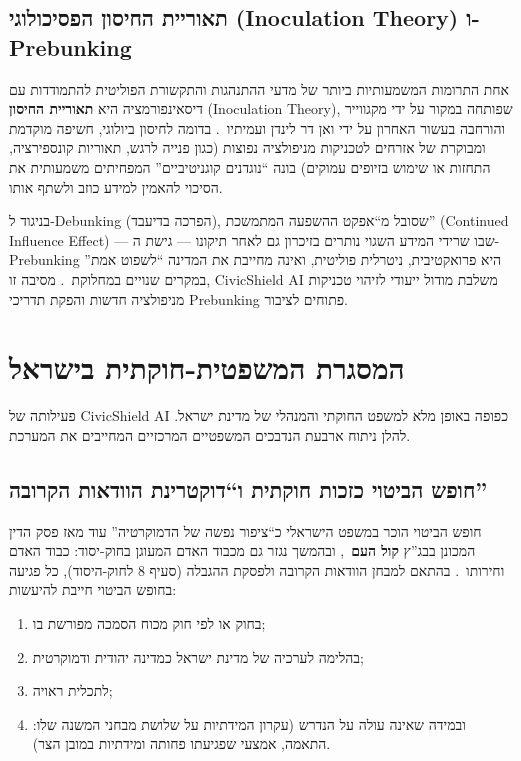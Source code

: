 \subsection{תאוריית החיסון הפסיכולוגי (\textenglish{Inoculation Theory}) ו-\textenglish{Prebunking}}

אחת התרומות המשמעותיות ביותר של מדעי ההתנהגות והתקשורת הפוליטית להתמודדות עם דיסאינפורמציה היא \textbf{תאוריית החיסון} (\textenglish{Inoculation Theory}), שפותחה במקור על ידי מקגווייר והורחבה בעשור האחרון על ידי ואן דר לינדן ועמיתיו~\cite{roozenbeek2022psychological}. בדומה לחיסון ביולוגי, חשיפה מוקדמת ומבוקרת של אזרחים לטכניקות מניפולציה נפוצות (כגון פנייה לרגש, תאוריות קונספירציה, התחזות או שימוש בזיופים עמוקים) בונה ``נוגדנים קוגניטיביים'' המפחיתים משמעותית את הסיכוי להאמין למידע כוזב ולשתף אותו.

בניגוד ל-\textenglish{Debunking} (הפרכה בדיעבד), שסובל מ``אפקט ההשפעה המתמשכת'' (\textenglish{Continued Influence Effect}) --- שבו שרידי המידע השגוי נותרים בזיכרון גם לאחר תיקונו --- גישת ה-\textenglish{Prebunking} היא פרואקטיבית, ניטרלית פוליטית, ואינה מחייבת את המדינה ``לשפוט אמת'' במקרים שנויים במחלוקת~\cite{lewandowsky2021countering}. מסיבה זו, \textenglish{CivicShield AI} משלבת מודול ייעודי לזיהוי טכניקות מניפולציה חדשות והפקת תדריכי \textenglish{Prebunking} פתוחים לציבור.

\section{המסגרת המשפטית-חוקתית בישראל}
\label{sec:israeli_constitutional_law}

פעילותה של \textenglish{CivicShield AI} כפופה באופן מלא למשפט החוקתי והמנהלי של מדינת ישראל. להלן ניתוח ארבעת הנדבכים המשפטיים המרכזיים המחייבים את המערכת.

\subsection{חופש הביטוי כזכות חוקתית ו``דוקטרינת הוודאות הקרובה''}

חופש הביטוי הוכר במשפט הישראלי כ``ציפור נפשה של הדמוקרטיה'' עוד מאז פסק הדין המכונן בבג''ץ \textbf{קול העם}~\cite{kolhaam1953}, ובהמשך נגזר גם מכבוד האדם המעוגן בחוק-יסוד: כבוד האדם וחירותו~\cite{basiclaw1992}. בהתאם למבחן הוודאות הקרובה ולפסקת ההגבלה (סעיף 8 לחוק-היסוד), כל פגיעה בחופש הביטוי חייבת להיעשות:
\begin{enumerate}
    \item בחוק או לפי חוק מכוח הסמכה מפורשת בו;
    \item בהלימה לערכיה של מדינת ישראל כמדינה יהודית ודמוקרטית;
    \item לתכלית ראויה;
    \item ובמידה שאינה עולה על הנדרש (עקרון המידתיות על שלושת מבחני המשנה שלו: התאמה, אמצעי שפגיעתו פחותה ומידתיות במובן הצר).
\end{enumerate}

